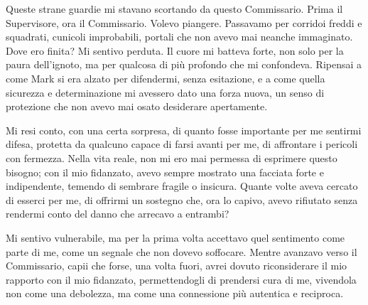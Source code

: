 Queste strane guardie mi stavano scortando da questo Commissario. Prima il Supervisore, ora il Commissario. Volevo piangere. Passavamo per  corridoi freddi e squadrati, cunicoli improbabili, portali che non avevo mai neanche immaginato. Dove ero finita? Mi sentivo perduta. Il cuore mi batteva forte, non solo per la paura dell'ignoto, ma per qualcosa di più profondo che mi confondeva. Ripensai a come Mark si era alzato per difendermi, senza esitazione, e a come quella sicurezza e determinazione mi avessero dato una forza nuova, un senso di protezione che non avevo mai osato desiderare apertamente.

Mi resi conto, con una certa sorpresa, di quanto fosse importante per me sentirmi difesa, protetta da qualcuno capace di farsi avanti per me, di affrontare i pericoli con fermezza. Nella vita reale, non  mi ero mai permessa di esprimere questo bisogno; con il mio fidanzato, avevo sempre mostrato una facciata forte e indipendente, temendo di sembrare fragile o insicura. Quante volte aveva cercato di esserci per me, di offrirmi un sostegno che, ora lo capivo, avevo rifiutato senza rendermi conto del danno che arrecavo a entrambi?

Mi sentivo vulnerabile, ma per la prima volta accettavo quel sentimento come parte di me, come un segnale che non dovevo soffocare. Mentre avanzavo verso il Commissario, capii che forse, una volta fuori, avrei dovuto riconsiderare il mio rapporto con il mio fidanzato, permettendogli di prendersi cura di me, vivendola non come una debolezza, ma come una connessione più autentica e reciproca.
